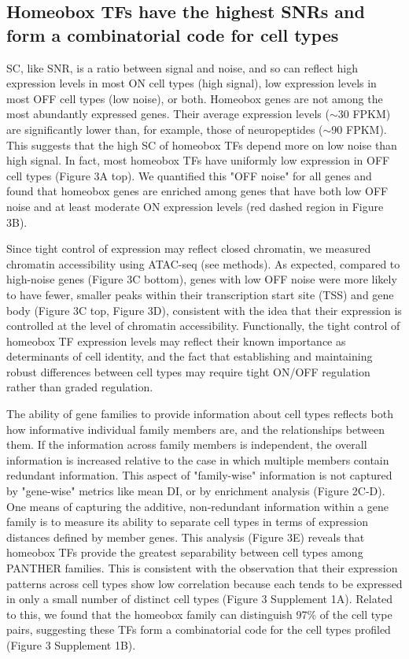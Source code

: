 \subsection{Homeobox TFs have the highest SNRs and form a combinatorial code for cell types}
SC, like SNR, is a ratio between signal and noise, and so can reflect high expression levels in most ON cell types (high signal), low expression levels in most OFF cell types (low noise), or both. Homeobox genes are not among the most abundantly expressed genes. Their average expression levels ($\sim$30 FPKM) are significantly lower than, for example, those of neuropeptides ($\sim$90 FPKM). This suggests that the high SC of homeobox TFs depend more on low noise than high signal. In fact, most homeobox TFs have uniformly low expression in OFF cell types (Figure 3A top). We quantified this "OFF noise" for all genes and found that homeobox genes are enriched among genes that have both low OFF noise and at least moderate ON expression levels (red dashed region in Figure 3B).

Since tight control of expression may reflect closed chromatin, we measured chromatin accessibility using ATAC-seq (see methods). As expected, compared to high-noise genes (Figure 3C bottom), genes with low OFF noise were more likely to have fewer, smaller peaks within their transcription start site (TSS) and gene body (Figure 3C top, Figure 3D), consistent with the idea that their expression is controlled at the level of chromatin accessibility. Functionally, the tight control of homeobox TF expression levels may reflect their known importance as determinants of cell identity, and the fact that establishing and maintaining robust differences between cell types may require tight ON/OFF regulation rather than graded regulation.

The ability of gene families to provide information about cell types reflects both how informative individual family members are, and the relationships between them. If the information across family members is independent, the overall information is increased relative to the case in which multiple members contain redundant information. This aspect of "family-wise" information is not captured by "gene-wise" metrics like mean DI, or by enrichment analysis (Figure 2C-D). One means of capturing the additive, non-redundant information within a gene family is to measure its ability to separate cell types in terms of expression distances defined by member genes. This analysis (Figure 3E) reveals that homeobox TFs provide the greatest separability between cell types among PANTHER families. This is consistent with the observation that their expression patterns across cell types show low correlation because each tends to be expressed in only a small number of distinct cell types (Figure 3 Supplement 1A). Related to this, we found that the homeobox family can distinguish 97\% of the cell type pairs, suggesting these TFs form a combinatorial code for the cell types profiled (Figure 3 Supplement 1B). 

